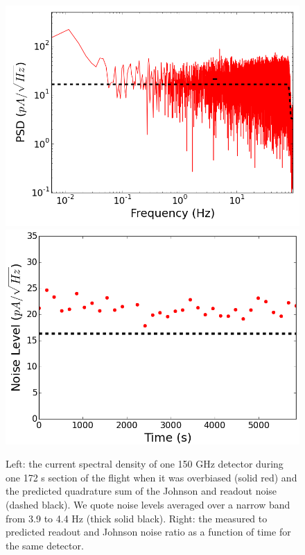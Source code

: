 \begin{figure}[htp]
\begin{center}
\includegraphics[width=0.48\columnwidth]{figures/board66_wire1_ch03_1356968507s_overbias}
\includegraphics[width=0.48\columnwidth]{figures/board66_wire1_ch03_overbias}
\caption[Spectral density and noise as a function of time for one overbiased bolometer in flight]{Left: the current spectral density of one 150 GHz detector during one 172 s section of the flight when it was overbiased (solid red) and the predicted quadrature sum of the Johnson and readout noise (dashed black). We quote noise levels averaged over a narrow band from 3.9 to 4.4 Hz (thick solid black). Right: the measured to predicted readout and Johnson noise ratio as a function of time for the same detector.
\label{fig:one_bolo_overbias_noise} }
\end{center}
\end{figure}


